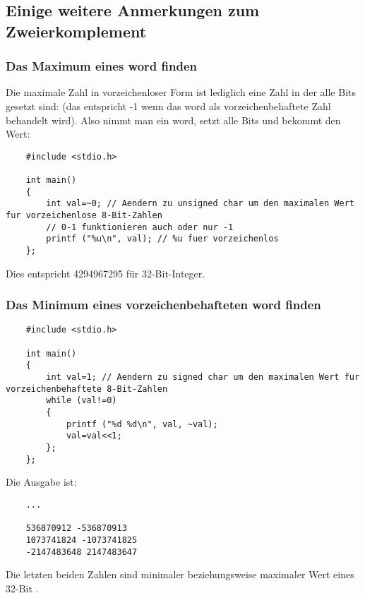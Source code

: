 \subsection{Einige weitere Anmerkungen zum Zweierkomplement}

\subsubsection{Das Maximum eines \gls{word} finden}
Die maximale Zahl in vorzeichenloser Form ist lediglich eine Zahl in der alle
Bits gesetzt sind: 
(das entspricht -1 wenn das \gls{word} als vorzeichenbehaftete Zahl behandelt wird).
Also nimmt man ein \gls{word}, setzt alle Bits und bekommt den Wert:

\begin{lstlisting}
	#include <stdio.h>

	int main()
	{
		int val=~0; // Aendern zu unsigned char um den maximalen Wert fur vorzeichenlose 8-Bit-Zahlen
		// 0-1 funktionieren auch oder nur -1
		printf ("%u\n", val); // %u fuer vorzeichenlos
	};
\end{lstlisting}

Dies entspricht 4294967295 für 32-Bit-Integer.

\subsubsection{Das Minimum eines vorzeichenbehafteten \gls{word} finden}



\begin{lstlisting}
	#include <stdio.h>

	int main()
	{
		int val=1; // Aendern zu signed char um den maximalen Wert fur vorzeichenbehaftete 8-Bit-Zahlen
		while (val!=0)
		{
			printf ("%d %d\n", val, ~val);
			val=val<<1;
		};
	};
\end{lstlisting}

Die Ausgabe ist:

\begin{lstlisting}
	...

	536870912 -536870913
	1073741824 -1073741825
	-2147483648 2147483647
\end{lstlisting}

Die letzten beiden Zahlen sind minimaler beziehungsweise maximaler Wert eines 32-Bit .
